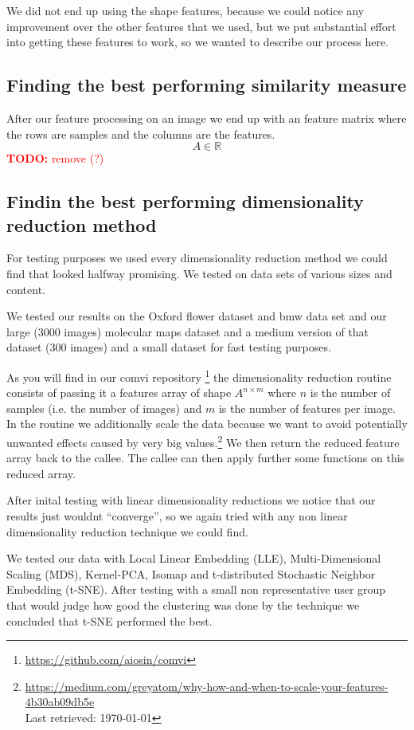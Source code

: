 \documentclass[journal]{vgtc}       %
\newcommand{\todo}[1]{\textcolor{red}{\textbf{TODO:} #1}}
\begin{document}
We did not end up using the shape features, because we could notice any improvement over the other features that we used, but we put substantial effort into getting these features to work, so we wanted to describe our process here.

\subsection{Finding the best performing similarity measure}

After our feature processing on an image we end up with an feature matrix where the rows are samples  and the columns are the features.  \[A \in \mathbb{R}\] \todo{remove (?) }


\subsection{Findin the best performing  dimensionality reduction method}
For testing purposes we used every dimensionality reduction method we could find that looked halfway promising. We tested on data sets of various sizes and content.

We tested our results on the Oxford flower dataset and bmw data set and our large (3000 images) molecular maps dataset and a medium version of that dataset (300 images) and a small dataset for fast testing purposes.

As you will find in our comvi repository \footnote{\url{https://github.com/aiosin/comvi}} the dimensionality reduction routine consists of passing it a features array of shape \(A^{n\times m}\) where \(n\) is the number of samples (i.e. the number of images) and \(m\) is the number of features per image.
In the routine we additionally scale the data because we want to avoid potentially unwanted effects caused by very big values.\footnote{\url{https://medium.com/greyatom/why-how-and-when-to-scale-your-features-4b30ab09db5e} \\ Last retrieved: \today}
We then return the reduced feature array back to the callee. The callee can then apply further some functions on this reduced array.

After inital testing with linear dimensionality reductions we notice that our results just wouldnt ``converge'', so we again tried with any non linear dimensionality reduction technique we could find.

We tested our data with Local Linear Embedding (LLE), Multi-Dimensional Scaling (MDS), Kernel-PCA, Isomap and t-distributed Stochastic Neighbor Embedding (t-SNE).
After testing with a small non representative user group that would judge how good the clustering was done by the technique we concluded that t-SNE performed the best.
\end{document}
